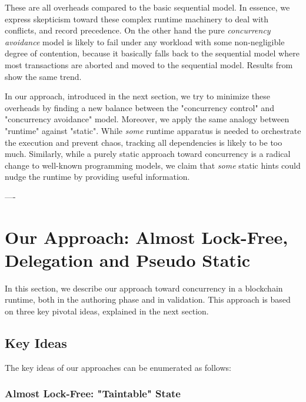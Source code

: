 These are all overheads compared to the basic sequential model. In essence, we express skepticism
toward these complex runtime machinery to deal with conflicts, and record precedence. On the other
hand the pure \textit{concurrency avoidance} model is likely to fail under any workload with some
non-negligible degree of contention, because it basically falls back to the sequential model where
most transactions are aborted and moved to the sequential model. Results from
\cite{saraphYOLOEmpiricalStudy2019} show the same trend.

In our approach, introduced in the next section, we try to minimize these overheads by finding a new
balance between the "concurrency control" and "concurrency avoidance" model. Moreover, we apply the
same analogy between "runtime" against "static". While \textit{some} runtime apparatus is needed to
orchestrate the execution and prevent chaos, tracking all dependencies is likely to be too much.
Similarly, while a purely static approach toward concurrency is a radical change to well-known
programming models, we claim that \textit{some} static hints could nudge the runtime by providing
useful information.

----

\section{Our Approach: Almost Lock-Free, Delegation and Pseudo Static}
\label{chap_desgin:sec:our_approach}

In this section, we describe our approach toward concurrency in a blockchain runtime, both in
the authoring phase and in validation. This approach is based on three key pivotal ideas, explained
in the next section.

\subsection{Key Ideas}

The key ideas of our approaches can be enumerated as follows:

\subsubsection{Almost Lock-Free: "Taintable" State}\label{chapt_approach:subsubsec:taintable_state}

